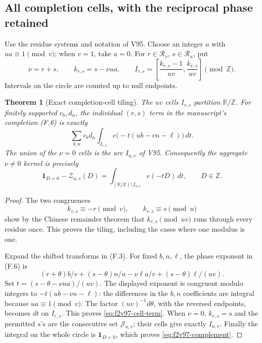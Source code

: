 \documentclass[11pt]{article}
\newtheorem{theorem}{Theorem}[section]
\theoremstyle{definition}
\theoremstyle{remark}
\begin{document}
\subsection{All completion cells, with the reciprocal phase retained}

Use the residue systems and notation of V95.  Choose an integer
\(a\) with \(ua\equiv1\pmod v\); when \(v=1\), take \(a=0\).
For \(r\in\mathcal R_v\), \(s\in\mathcal R_u\), put
\begin{equation}
 \nu=r+s,\qquad k_{r,s}=s-\nu ua,\qquad
 I_{r,s}=\left[\frac{k_{r,s}-1}{uv},\frac{k_{r,s}}{uv}\right]
                         \pmod {\mathbb Z}.
 \label{eq:f2v97-cell}
\end{equation}
Intervals on the circle are counted up to null endpoints.

\begin{theorem}[Exact completion-cell tiling]
\label{thm:f2v97-tiling}
The \(uv\) cells \(I_{r,s}\) partition \(\mathbb R/\mathbb Z\).
For finitely supported \(c_b,d_n\), the individual \((r,s)\) term
in the manuscript's completion (F.6) is exactly
\begin{equation}
 \sum_{b,n}c_bd_n\int_{I_{r,s}}e\bigl(-t(ub-vn-\ell)\bigr)\,dt.
 \label{eq:f2v97-cell-term}
\end{equation}
The union of the \(\nu=0\) cells is the arc \(I_{u,v}\) of V95.
Consequently the aggregate \(\nu\ne0\) kernel is precisely
\begin{equation}
 \mathbf1_{D=0}-\mathscr Z_{u,v}(D)
 =\int_{(\mathbb R/\mathbb Z)\setminus I_{u,v}}e(-tD)\,dt,
 \qquad D\in\mathbb Z.
 \label{eq:f2v97-complement}
\end{equation}
\end{theorem}

\begin{proof}
The two congruences
\[
 k_{r,s}\equiv-r\pmod v,\qquad k_{r,s}\equiv s\pmod u
\]
show by the Chinese remainder theorem that \(k_{r,s}\pmod {uv}\)
runs through every residue once.  This proves the tiling, including
the cases where one modulus is one.

Expand the shifted transforms in (F.3).  For fixed \(b,n,\ell\),
the phase exponent in (F.6) is
\[
 (r+\theta)b/v+(s-\theta)n/u
       -\nu\ell a/v+(s-\theta)\ell/(uv).
\]
Set \(t=(s-\theta-\nu ua)/(uv)\).  The displayed exponent is
congruent modulo integers to \(-t(ub-vn-\ell)\): the differences
in the \(b,n\) coefficients are integral because \(ua\equiv1\pmod v\).
The factor \((uv)^{-1}d\theta\), with the reversed endpoints, becomes
\(dt\) on \(I_{r,s}\).  This proves \eqref{eq:f2v97-cell-term}.
When \(\nu=0\), \(k_{r,s}=s\) and the permitted \(s\)'s are the
consecutive set \(\mathcal J_{u,v}\); their cells give exactly
\(I_{u,v}\).  Finally the integral on the whole circle is
\(\mathbf1_{D=0}\), which proves \eqref{eq:f2v97-complement}.
\end{proof}
\end{document}
